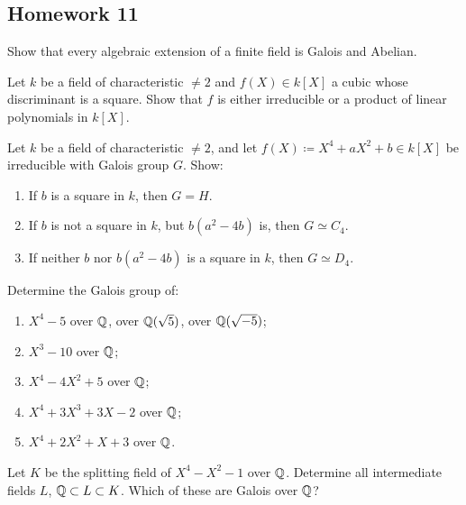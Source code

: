 \subsection{Homework 11}
\begin{problem}
  Show that every algebraic extension of a finite field is Galois and
  Abelian.
\end{problem}
\begin{solution}
\end{solution}

\begin{problem}
  Let $k$ be a field of characteristic $\neq 2$ and $f(X)\in k[X]$ a
  cubic whose discriminant is a square. Show that $f$ is either irreducible
  or a product of linear polynomials in $k[X]$.
\end{problem}
\begin{solution}
\end{solution}

\begin{problem}
  Let $k$ be a field of characteristic $\neq 2$, and let
  $f(X)\coloneq X^4+aX^2+b\in k[X]$ be irreducible with Galois group
  $G$. Show:
  \begin{enumerate}[label=(\roman*),noitemsep]
  \item If $b$ is a square in $k$, then $G=H$.
  \item If $b$ is not a square in $k$, but $b(a^2-4b)$ is, then
    $G\simeq C_4$.
  \item If neither $b$ nor $b(a^2-4b)$ is a square in $k$, then
    $G\simeq D_4$.
  \end{enumerate}
\end{problem}
\begin{solution}
\end{solution}

\begin{problem}
  Determine the Galois group of:
  \begin{enumerate}[label=(\alph*),noitemsep]
  \item $X^4-5$ over $\mathbb{Q}$, over $\mathbb{Q}(\sqrt{5})$, over $\mathbb{Q}(\sqrt{-5})$;
  \item $X^3-10$ over $\mathbb{Q}$;
  \item $X^4-4X^2+5$ over $\mathbb{Q}$;
  \item $X^4+3X^3+3X-2$ over $\mathbb{Q}$;
  \item $X^4+2X^2+X+3$ over $\mathbb{Q}$.
  \end{enumerate}
\end{problem}
\begin{solution}
\end{solution}

\begin{problem}
  Let $K$ be the splitting field of $X^4-X^2-1$ over $\mathbb{Q}$. Determine
  all intermediate fields $L$, $\mathbb{Q}\subset L\subset K$. Which of
  these are Galois over $\mathbb{Q}$?
\end{problem}
\begin{solution}
\end{solution}

